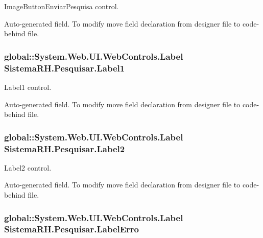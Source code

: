ImageButtonEnviarPesquisa control. 

Auto-\/generated field. To modify move field declaration from designer file to code-\/behind file. \hypertarget{class_sistema_r_h_1_1_pesquisar_a170f9006967454b5b0bda89191fe4555}{
\subsubsection[{Label1}]{\setlength{\rightskip}{0pt plus 5cm}global::System.Web.UI.WebControls.Label {\bf SistemaRH.Pesquisar.Label1}}}
\label{class_sistema_r_h_1_1_pesquisar_a170f9006967454b5b0bda89191fe4555}


Label1 control. 

Auto-\/generated field. To modify move field declaration from designer file to code-\/behind file. \hypertarget{class_sistema_r_h_1_1_pesquisar_a873d1b813fa7f47e8b18a9a1bb7b2d18}{
\subsubsection[{Label2}]{\setlength{\rightskip}{0pt plus 5cm}global::System.Web.UI.WebControls.Label {\bf SistemaRH.Pesquisar.Label2}}}
\label{class_sistema_r_h_1_1_pesquisar_a873d1b813fa7f47e8b18a9a1bb7b2d18}


Label2 control. 

Auto-\/generated field. To modify move field declaration from designer file to code-\/behind file. \hypertarget{class_sistema_r_h_1_1_pesquisar_afd48762baccfaf1cc5996bd2d7646839}{
\subsubsection[{LabelErro}]{\setlength{\rightskip}{0pt plus 5cm}global::System.Web.UI.WebControls.Label {\bf SistemaRH.Pesquisar.LabelErro}}}
\label{class_sistema_r_h_1_1_pesquisar_afd48762baccfaf1cc5996bd2d7646839}


